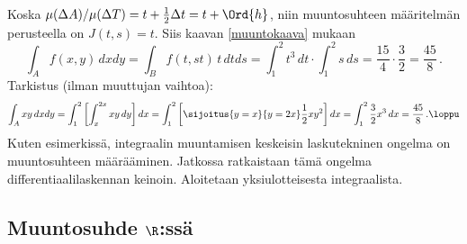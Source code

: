 Koska $\mu(\Delta A)/\mu(\Delta T)=t+\frac{1}{2}\Delta t = t + \Ord{h}$, niin muuntosuhteen
määritelmän perusteella on $J(t,s)=t$. Siis kaavan \eqref{muuntokaava} mukaan
\[
\int_A f(x,y)\,dxdy = \int_B f(t,st)\,t\,dtds = \int_1^2 t^3\,dt\cdot\int_1^2 s\,ds 
                    = \frac{15}{4}\cdot\frac{3}{2} = \frac{45}{8}\,.
\]
Tarkistus (ilman muuttujan vaihtoa):
\[
\int_A xy\,dxdy = \int_1^2\left[\int_x^{2x} xy\,dy\right]dx
                = \int_1^2\left[\sijoitus{y=x}{y=2x} \frac{1}{2}xy^2\right]dx
                = \int_1^2 \frac{3}{2}x^3\,dx = \frac{45}{8}\,. \loppu
\]
Kuten esimerkissä, integraalin muuntamisen keskeisin laskutekninen ongelma on muuntosuhteen
määrääminen. Jatkossa ratkaistaan tämä ongelma differentiaalilaskennan keinoin. Aloitetaan
yksiulotteisesta integraalista.


\subsection{Muuntosuhde $\R$:ssä}

